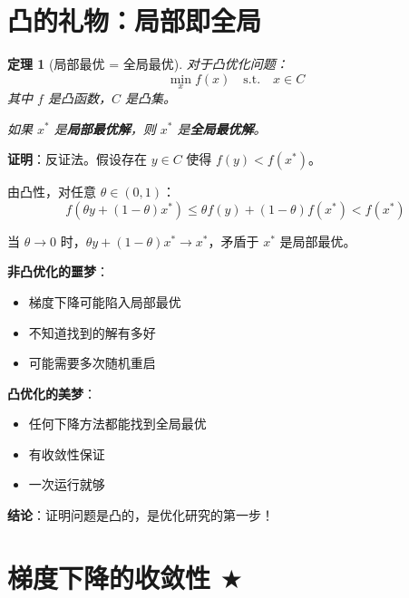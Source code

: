 \documentclass[12pt, a4paper]{ctexart}
\newtheorem{theorem}{定理}[section]
\begin{document}
\section{凸的礼物：局部即全局}

\begin{blackboard}[凸优化的核心定理]

\begin{theorem}[局部最优 = 全局最优]
对于凸优化问题：
\[
\min_x f(x) \quad \text{s.t.} \quad x \in C
\]
其中 $f$ 是凸函数，$C$ 是凸集。

如果 $x^*$ 是\textbf{局部最优解}，则 $x^*$ 是\textbf{全局最优解}。
\end{theorem}

\textbf{证明}：反证法。假设存在 $y \in C$ 使得 $f(y) < f(x^*)$。

由凸性，对任意 $\theta \in (0, 1)$：
\[
f(\theta y + (1-\theta) x^*) \leq \theta f(y) + (1-\theta) f(x^*) < f(x^*)
\]

当 $\theta \to 0$ 时，$\theta y + (1-\theta) x^* \to x^*$，矛盾于 $x^*$ 是局部最优。

\end{blackboard}

\begin{insight}[为什么这个定理如此重要？]

\textbf{非凸优化的噩梦}：
\begin{itemize}
    \item 梯度下降可能陷入局部最优
    \item 不知道找到的解有多好
    \item 可能需要多次随机重启
\end{itemize}

\textbf{凸优化的美梦}：
\begin{itemize}
    \item 任何下降方法都能找到全局最优
    \item 有收敛性保证
    \item 一次运行就够
\end{itemize}

\textbf{结论}：证明问题是凸的，是优化研究的第一步！

\end{insight}

\section{梯度下降的收敛性 $\bigstar$}
\end{document}
